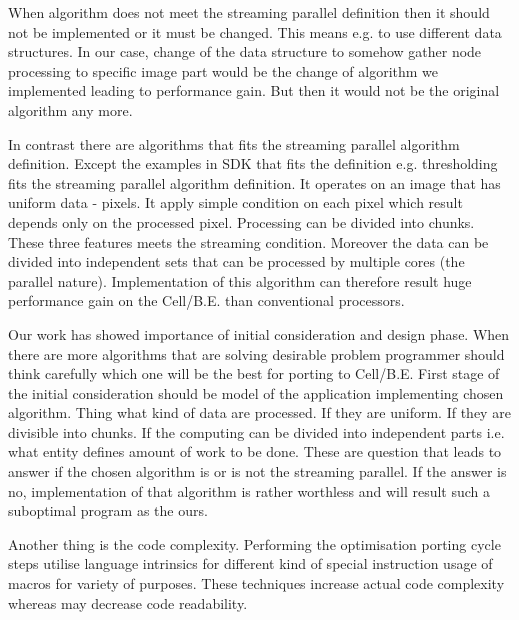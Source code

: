 \par
When algorithm does not meet the streaming parallel definition then it should not be implemented or it must be changed.
This means e.g. to use different data structures.
In our case, change of the data structure to somehow gather node processing to specific image part would be the change of algorithm we implemented leading to performance gain.
But then it would not be the original algorithm any more.

\par
In contrast there are algorithms that fits the streaming parallel algorithm definition.
Except the examples in SDK that fits the definition e.g. thresholding fits the streaming parallel algorithm definition.
It operates on an image that has uniform data - pixels.
It apply simple condition on each pixel which result depends only on the processed pixel.
Processing can be divided into chunks.
These three features meets the streaming condition.
Moreover the data can be divided into independent sets that can be processed by multiple cores (the parallel nature).
Implementation of this algorithm can therefore result huge performance gain on the \mbox{Cell/B.E.} than conventional processors.

\par
Our work has showed importance of initial consideration and design phase.
When there are more algorithms that are solving desirable problem programmer should think carefully which one will be the best for porting to \mbox{Cell/B.E.}
First stage of the initial consideration should be model of the application implementing chosen algorithm.
Thing what kind of data are processed.
If they are uniform.
If they are divisible into chunks.
If the computing can be divided into independent parts i.e. what entity defines amount of work to be done.
These are question that leads to answer if the chosen algorithm is or is not the streaming parallel.
If the answer is no, implementation of that algorithm is rather worthless and will result such a suboptimal program as the ours.

\par
Another thing is the code complexity.
Performing the optimisation porting cycle steps utilise language intrinsics for different kind of special instruction usage of macros for variety of purposes.
These techniques increase actual code complexity whereas may decrease code readability.


